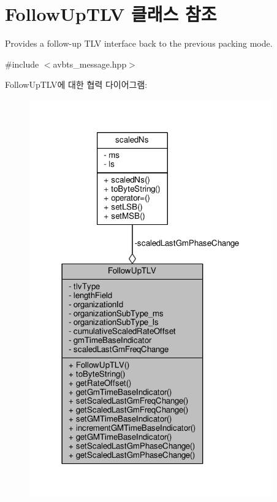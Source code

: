 \hypertarget{class_follow_up_t_l_v}{}\section{Follow\+Up\+T\+LV 클래스 참조}
\label{class_follow_up_t_l_v}


Provides a follow-\/up T\+LV interface back to the previous packing mode.  




{\ttfamily \#include $<$avbts\+\_\+message.\+hpp$>$}



Follow\+Up\+T\+L\+V에 대한 협력 다이어그램\+:
\nopagebreak
\begin{figure}[H]
\begin{center}
\leavevmode
\includegraphics[width=297pt]{class_follow_up_t_l_v__coll__graph}
\end{center}
\end{figure}

